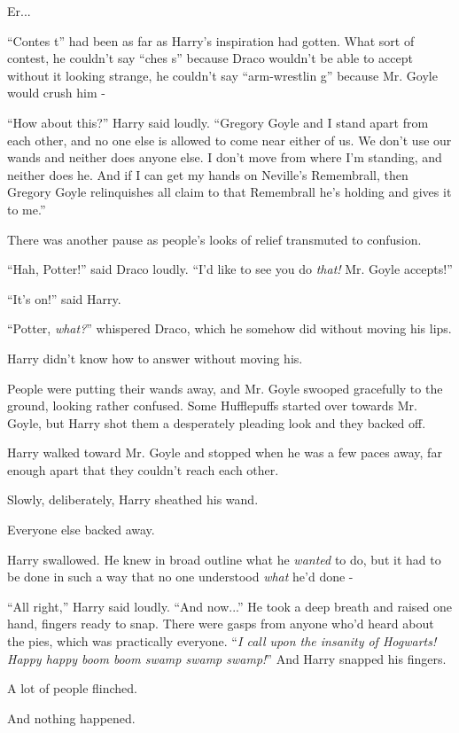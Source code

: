 Er...

``Contes t'' had been as far as Harry's inspiration had gotten. What sort of contest, he couldn't say ``ches s'' because Draco wouldn't be able to accept without it looking strange, he couldn't say ``arm-wrestlin g'' because Mr. Goyle would crush him -

``How about this?'' Harry said loudly. ``Gregory Goyle and I stand apart from each other, and no one else is allowed to come near either of us. We don't use our wands and neither does anyone else. I don't move from where I'm standing, and neither does he. And if I can get my hands on Neville's Remembrall, then Gregory Goyle relinquishes all claim to that Remembrall he's holding and gives it to me.''

There was another pause as people's looks of relief transmuted to confusion.

``Hah, Potter!'' said Draco loudly. ``I'd like to see you do \emph{that!} Mr. Goyle accepts!''

``It's on!'' said Harry.

``Potter, \emph{what?}'' whispered Draco, which he somehow did without moving his lips.

Harry didn't know how to answer without moving his.

People were putting their wands away, and Mr. Goyle swooped gracefully to the ground, looking rather confused. Some Hufflepuffs started over towards Mr. Goyle, but Harry shot them a desperately pleading look and they backed off.

Harry walked toward Mr. Goyle and stopped when he was a few paces away, far enough apart that they couldn't reach each other.

Slowly, deliberately, Harry sheathed his wand.

Everyone else backed away.

Harry swallowed. He knew in broad outline what he \emph{wanted} to do, but it had to be done in such a way that no one understood \emph{what} he'd done -

``All right,'' Harry said loudly. ``And now...'' He took a deep breath and raised one hand, fingers ready to snap. There were gasps from anyone who'd heard about the pies, which was practically everyone. ``\emph{I call upon the insanity of Hogwarts! Happy happy boom boom swamp swamp swamp!}'' And Harry snapped his fingers.

A lot of people flinched.

And nothing happened.

